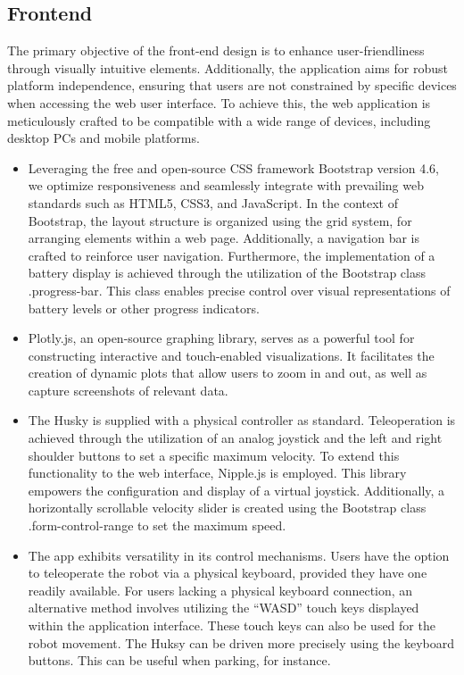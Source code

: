 \documentclass[conference]{IEEEtran}
\begin{document}
\subsection{Frontend}
The primary objective of the front-end design is to enhance user-friendliness through visually intuitive elements. Additionally, the application aims for robust platform independence, ensuring that users are not constrained by specific devices when accessing the web user interface. 
To achieve this, the web application is meticulously crafted to be compatible with a wide range of devices, including desktop PCs and mobile platforms. 
\begin{itemize}
\item Leveraging the free and open-source CSS framework Bootstrap version 4.6, we optimize responsiveness and seamlessly integrate with prevailing web standards such as HTML5, CSS3, and JavaScript. 
In the context of Bootstrap, the layout structure is organized using the grid system, for arranging elements within a web page. 
Additionally, a navigation bar is crafted to reinforce user navigation.
Furthermore, the implementation of a battery display is achieved through the utilization of the Bootstrap class .progress-bar. 
This class enables precise control over visual representations of battery levels or other progress indicators.
\item Plotly.js, an open-source graphing library, serves as a powerful tool for constructing interactive and touch-enabled visualizations. It facilitates the creation of dynamic plots that allow users to zoom in and out, as well as capture screenshots of relevant data.
\item The Husky is supplied with a physical controller as standard. Teleoperation is achieved through the utilization of an analog joystick and the left and right shoulder buttons to set a specific maximum velocity.
To extend this functionality to the web interface, Nipple.js is employed. This library empowers the configuration and display of a virtual joystick. Additionally, a horizontally scrollable velocity slider is created using the Bootstrap class .form-control-range to set the maximum speed.
\item The app exhibits versatility in its control mechanisms. Users have the option to teleoperate the robot via a physical keyboard, provided they have one readily available. For users lacking a physical keyboard connection, an alternative method involves utilizing the “WASD” touch keys displayed within the application interface. 
These touch keys can also be used for the robot movement. The Huksy can be driven more precisely using the keyboard buttons. This can be useful when parking, for instance.
\end{itemize}
\end{document}
